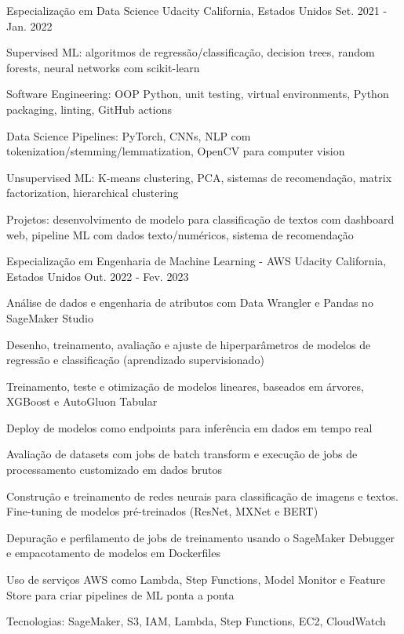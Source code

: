 \begin{cventries}
  \cventry
    {Especialização em Data Science} %
    {Udacity} %
    {California, Estados Unidos} %
    {Set. 2021 - Jan. 2022} %
    {
      \begin{cvitems} %
        \item {Supervised ML: algoritmos de regressão/classificação, decision trees, random forests, neural networks com scikit-learn}
        \item {Software Engineering: OOP Python, unit testing, virtual environments, Python packaging, linting, GitHub actions}
        \item {Data Science Pipelines: PyTorch, CNNs, NLP com tokenization/stemming/lemmatization, OpenCV para computer vision}
        \item {Unsupervised ML: K-means clustering, PCA, sistemas de recomendação, matrix factorization, hierarchical clustering}
        \item {Projetos: desenvolvimento de modelo para classificação de textos com dashboard web, pipeline ML com dados texto/numéricos, sistema de recomendação}
      \end{cvitems}
    }

  \cventry
    {Especialização em Engenharia de Machine Learning - AWS} %
    {Udacity} %
    {California, Estados Unidos} %
    {Out. 2022 - Fev. 2023} %
    {
      \begin{cvitems} %
        \item {Análise de dados e engenharia de atributos com Data Wrangler e Pandas no SageMaker Studio}
        \item {Desenho, treinamento, avaliação e ajuste de hiperparâmetros de modelos de regressão e classificação (aprendizado supervisionado)}
        \item {Treinamento, teste e otimização de modelos lineares, baseados em árvores, XGBoost e AutoGluon Tabular}
        \item {Deploy de modelos como endpoints para inferência em dados em tempo real}
        \item {Avaliação de datasets com jobs de batch transform e execução de jobs de processamento customizado em dados brutos}
        \item {Construção e treinamento de redes neurais para classificação de imagens e textos. Fine-tuning de modelos pré-treinados (ResNet, MXNet e BERT)}
        \item {Depuração e perfilamento de jobs de treinamento usando o SageMaker Debugger e empacotamento de modelos em Dockerfiles}
        \item {Uso de serviços AWS como Lambda, Step Functions, Model Monitor e Feature Store para criar pipelines de ML ponta a ponta}
        \item {Tecnologias: SageMaker, S3, IAM, Lambda, Step Functions, EC2, CloudWatch}
      \end{cvitems}
    }


\end{cventries}
